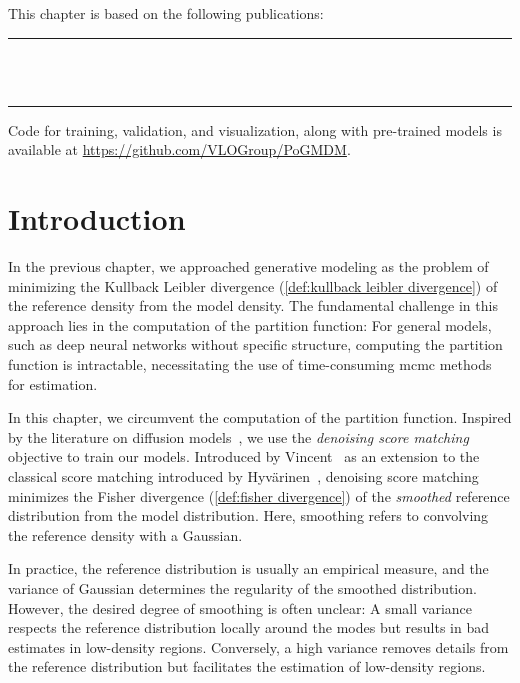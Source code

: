This chapter is based on the following publications:\\
\rule{\linewidth}{.1em}
\\[.2cm]
\\
\rule{\linewidth}{.1em}
Code for training, validation, and visualization, along with pre-trained models is available at \href{https://github.com/VLOGroup/PoGMDM}{https://github.com/VLOGroup/PoGMDM}.
\section{Introduction}%
\label{sec:introduction pogmdm}
In the previous chapter, we approached generative modeling as the problem of minimizing the Kullback Leibler divergence (\cref{def:kullback leibler divergence}) of the reference density from the model density.
The fundamental challenge in this approach lies in the computation of the partition function:
For general models, such as deep neural networks without specific structure, computing the partition function is intractable, necessitating the use of time-consuming \gls{mcmc} methods for estimation.

In this chapter, we circumvent the computation of the partition function.
Inspired by the literature on diffusion models~\cite{song_generative_2019,song2021scorebased}, we use the \emph{denoising score matching} objective to train our models.
Introduced by Vincent~\cite{vincent_connection_2011} as an extension to the classical score matching introduced by Hyvärinen~\cite{hyvarinen_estimation_2005}, denoising score matching minimizes the Fisher divergence (\cref{def:fisher divergence}) of the \emph{smoothed} reference distribution from the model distribution.
Here, smoothing refers to convolving the reference density with a Gaussian.

In practice, the reference distribution is usually an empirical measure, and the variance of Gaussian determines the regularity of the smoothed distribution.
However, the desired degree of smoothing is often unclear:
A small variance respects the reference distribution locally around the modes but results in bad estimates in low-density regions.
Conversely, a high variance removes details from the reference distribution but facilitates the estimation of low-density regions.

